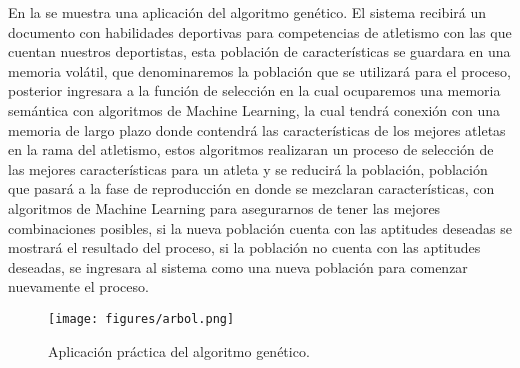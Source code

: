 \documentclass[10pt,twocolumn,a4paper]{articuloAPA}
\begin{document}

En la  se muestra una aplicación del algoritmo genético.  El sistema recibirá un documento con habilidades deportivas para competencias de atletismo con las que cuentan nuestros deportistas, esta población de características se guardara en una memoria volátil, que denominaremos la población que se utilizará para el proceso, posterior ingresara a la función de selección en la cual ocuparemos una memoria semántica con algoritmos de Machine Learning, la cual tendrá conexión con una memoria de largo plazo donde contendrá las características de los mejores atletas en la rama del atletismo, estos algoritmos realizaran un proceso de selección de las mejores características para un atleta y se reducirá la población, población que pasará a la fase de reproducción en donde se mezclaran características, con algoritmos de Machine Learning para asegurarnos de tener las mejores combinaciones posibles, si la nueva población cuenta con las aptitudes deseadas se mostrará el resultado del proceso, si la población no cuenta con las aptitudes deseadas, se ingresara al sistema como una nueva población para comenzar nuevamente el proceso.

\begin{figure}
  \centering
  \texttt{[image: figures/arbol.png]}
  \decoRule
  \caption[Aplicación práctica del algoritmo genético]{Aplicación práctica del algoritmo genético.}
  \label{fig:aplicacion}
\end{figure}

  \printbibliography
\end{document}
